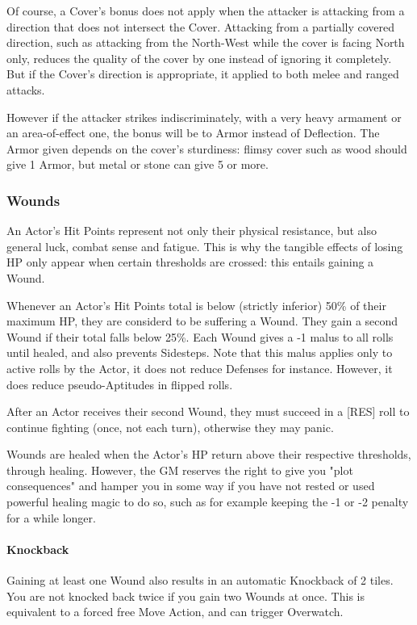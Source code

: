 Of course, a Cover's bonus does not apply when the attacker is attacking from a direction that does not intersect the Cover. Attacking from a partially covered direction, such as attacking from the North-West while the cover is facing North only, reduces the quality of the cover by one instead of ignoring it completely. But if the Cover's direction is appropriate, it applied to both melee and ranged attacks. 

However if the attacker strikes indiscriminately, with a very heavy armament or an area-of-effect one, the bonus will be to Armor instead of Deflection. The Armor given depends on the cover's sturdiness: flimsy cover such as wood should give 1 Armor, but metal or stone can give 5 or more. 

\subsubsection{Wounds} 
\label{wounds}

An Actor's Hit Points represent not only their physical resistance, but also general luck, combat sense and fatigue. This is why the tangible effects of losing HP only appear when certain thresholds are crossed: this entails gaining a Wound.

Whenever an Actor's Hit Points total is below (strictly inferior) 50\% of their maximum HP, they are considerd to be suffering a Wound. They gain a second Wound if their total falls below 25\%. Each Wound gives a -1 malus to all rolls until healed, and also prevents Sidesteps. Note that this malus applies only to active rolls by the Actor, it does not reduce Defenses for instance. However, it does reduce pseudo-Aptitudes in flipped rolls.

After an Actor receives their second Wound, they must succeed in a [RES] roll to continue fighting (once, not each turn), otherwise they may panic. 

Wounds are healed when the Actor's HP return above their respective thresholds, through healing. However, the GM reserves the right to give you "plot consequences" and hamper you in some way if you have not rested or used powerful healing magic to do so, such as for example keeping the -1 or -2 penalty for a while longer.

\paragraph{Knockback}

Gaining at least one Wound also results in an automatic Knockback of 2 tiles. You are not knocked back twice if you gain two Wounds at once. This is equivalent to a forced free Move Action, and can trigger Overwatch. 

